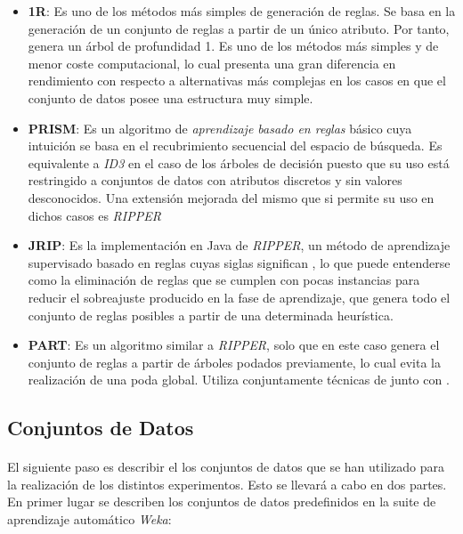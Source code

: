 \documentclass{article}
\begin{document}
			\begin{itemize}
				\item \textbf{1R}: Es uno de los métodos más simples de generación de reglas. Se basa en la generación de un conjunto de reglas a partir de un único atributo. Por tanto, genera un árbol de profundidad 1. Es uno de los métodos más simples y de menor coste computacional, lo cual presenta una gran diferencia en rendimiento con respecto a alternativas más complejas en los casos en que el conjunto de datos posee una estructura muy simple.

				\item \textbf{PRISM}: Es un algoritmo de \emph{aprendizaje basado en reglas} básico cuya intuición se basa en el recubrimiento secuencial del espacio de búsqueda. Es equivalente a \emph{ID3} en el caso de los árboles de decisión puesto que su uso está restringido a conjuntos de datos con atributos discretos y sin valores desconocidos. Una extensión mejorada del mismo que si permite su uso en dichos casos es \emph{RIPPER}

				\item \textbf{JRIP}: Es la implementación en Java de \emph{RIPPER}, un método de aprendizaje supervisado basado en reglas cuyas siglas significan , lo que puede entenderse como la eliminación de reglas que se cumplen con pocas instancias para reducir el sobreajuste producido en la fase de aprendizaje, que genera todo el conjunto de reglas posibles a partir de una determinada heurística.

				\item \textbf{PART}: Es un algoritmo similar a \emph{RIPPER}, solo que en este caso genera el conjunto de reglas a partir de árboles podados previamente, lo cual evita la realización de una poda global. Utiliza conjuntamente técnicas de  junto con .

			\end{itemize}

		\subsection{Conjuntos de Datos}
		\label{sec:datasets}

			\paragraph{}
			El siguiente paso es describir el los conjuntos de datos que se han utilizado para la realización de los distintos experimentos. Esto se llevará a cabo en dos partes. En primer lugar se describen los conjuntos de datos predefinidos en la suite de aprendizaje automático \emph{Weka}:
\end{document}
